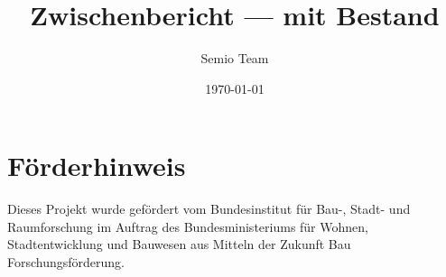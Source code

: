 \documentclass[language=de,theme=light,type=report,citestyle=numeric]{semio}
\title{Zwischenbericht --- mit Bestand}
\author{Semio Team}
\date{\today}
\begin{document}
\section*{Förderhinweis}
\begin{Blockquote}
Dieses Projekt wurde gefördert vom Bundesinstitut für Bau-, Stadt- und Raumforschung im Auftrag des Bundesministeriums für Wohnen, Stadtentwicklung und Bauwesen aus Mitteln der Zukunft Bau Forschungsförderung.
\end{Blockquote}
\end{document}
